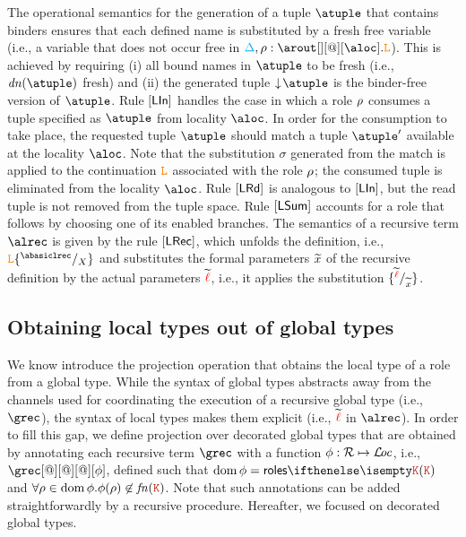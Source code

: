 The operational semantics for the generation of a tuple $\atuple$ that 
contains binders ensures that  each defined name  is substituted by a fresh free variable 
 (i.e., a variable that does not occur free in $\envmv, \arole : \arout[][@][\aloc].\aL$).
This is achieved by requiring  (i) all bound names in $\atuple$ to be fresh (i.e., $\dn\atuple$  fresh) and 
(ii)  the generated tuple $\eraseB\atuple$ is the binder-free version of $\atuple$. 
Rule $\mathsf{[LIn]}$ handles the case in which a role $\rho$
consumes  a tuple specified as $\atuple$ from locality $\aloc$. In order for the consumption to
take place, the  requested tuple $\atuple$ should match  a tuple $\atuple'$ available 
at the locality $\aloc$. 
Note that the substitution $\sigma$ generated from the match is applied 
to the continuation $\texttt{\textcolor{orange}L}$ associated with the role $\rho$; the
consumed tuple is eliminated from the locality $\aloc$. 
%
Rule $\mathsf{[LRd]}$ is analogous to $\mathsf{[LIn]}$, but the 
read tuple is not removed from the tuple space.
%
Rule $\mathsf{[LSum]}$ accounts for a role that follows by choosing one of 
its enabled branches. 
%
The semantics of a recursive term $\alrec$ is given by the rule
 $\mathsf{[LRec]}$, which unfolds the  definition, i.e., $\aL\sust X{\abasiclrec}$
 and substitutes the formal parameters $\widetilde{x}$ of the recursive
 definition by the actual parameters $\widetilde{{\color{red}\ell}}$, i.e., it applies
 the substitution $\{^{\widetilde{{\color{red}\ell}}} / _{\widetilde{x}}\}$.


\subsection{Obtaining local types out of global types}

We know introduce the projection operation that  
obtains the local type of a role from a  global type. 
% 
While the syntax of global types abstracts away from the 
 channels used for  coordinating the execution of 
a recursive global type (i.e., $\grec$), the syntax of 
local types makes them explicit (i.e., $\widetilde{{\color{red}\ell}}$ in $\alrec$). 
In order to fill this gap, we define projection over 
decorated global types that are obtained by annotating
 each recursive term $\grec$  with a function
 $\phi:\mathcal{R} \mapsto \mathcal{L}\!\mathit{oc}$, i.e., $\grec[@][@][@][\aphi]$, 
 defined such that $\dom\aphi = \roles\aK$ and $\forall \arole\in\dom\aphi. \aphi(\arole)\not\in\fn\aK$.
 Note that such annotations can be added straightforwardly by a recursive 
 procedure. Hereafter, we focused on decorated global types. 
 
